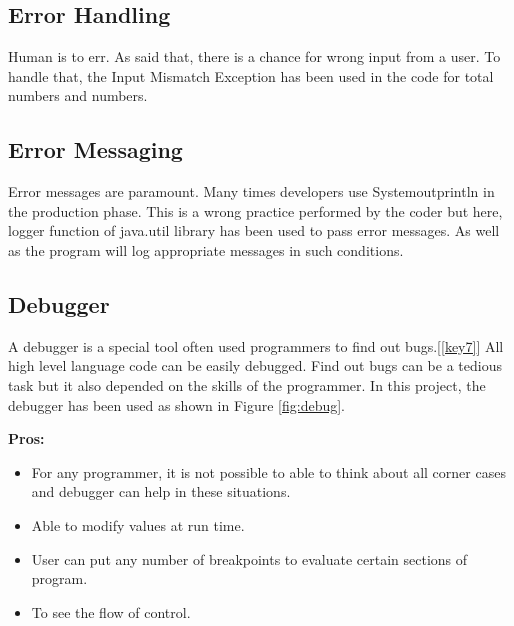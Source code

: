 \documentclass{scrartcl}
\begin{document}
\subsection{Error Handling}

\begin{spacing}{1.5}
\begin{Large}
Human is to err. As said that, there is a chance for wrong input from a user. To handle that, the Input Mismatch Exception has been used in the code for total numbers and numbers.  
\end{Large}
\end{spacing}

\subsection{Error Messaging}

\begin{spacing}{1.5}
\begin{Large}
Error messages are paramount. Many times developers use Systemoutprintln in the production phase. This is a wrong practice performed by the coder but here, logger function of java.util library has been used to pass error messages. As well as the program will log appropriate messages in such conditions.
\end{Large}
\end{spacing}

\subsection{Debugger}

\begin{spacing}{1.5}
\begin{Large}
A debugger is a special tool often used programmers to find out bugs.[\ref{key7}] All high level language code can be easily debugged. Find out bugs can be a tedious task but it also depended on the skills of the programmer. In this project, the debugger has been used as shown in Figure \ref{fig:debug}.  
\end{Large}
\end{spacing}

\begin{Large}
\vspace{0.5cm}
\textbf{Pros:}
\begin{itemize}
  \item For any programmer, it is not possible to able to think about all corner cases and debugger can help in these situations. 
  \item Able to modify values at run time.
  \item User can put any number of breakpoints to evaluate certain sections of program. 
  \item To see the flow of control. 
\end{itemize}
\end{Large}
\end{document}
